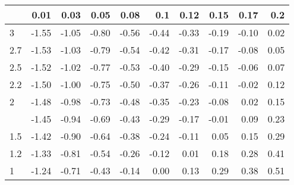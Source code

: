 
\begin{tabular}{lrrrrrrrrr}
\toprule
  & 0.01 & 0.03 & 0.05 & 0.08 & 0.1 & 0.12 & 0.15 & 0.17 & 0.2\\
\midrule
3 & -1.55 & -1.05 & -0.80 & -0.56 & -0.44 & -0.33 & -0.19 & -0.10 & 0.02\\
2.7 & -1.53 & -1.03 & -0.79 & -0.54 & -0.42 & -0.31 & -0.17 & -0.08 & 0.05\\
2.5 & -1.52 & -1.02 & -0.77 & -0.53 & -0.40 & -0.29 & -0.15 & -0.06 & 0.07\\
2.2 & -1.50 & -1.00 & -0.75 & -0.50 & -0.37 & -0.26 & -0.11 & -0.02 & 0.12\\
2 & -1.48 & -0.98 & -0.73 & -0.48 & -0.35 & -0.23 & -0.08 & 0.02 & 0.15\\
\addlinespace
1.7 & -1.45 & -0.94 & -0.69 & -0.43 & -0.29 & -0.17 & -0.01 & 0.09 & 0.23\\
1.5 & -1.42 & -0.90 & -0.64 & -0.38 & -0.24 & -0.11 & 0.05 & 0.15 & 0.29\\
1.2 & -1.33 & -0.81 & -0.54 & -0.26 & -0.12 & 0.01 & 0.18 & 0.28 & 0.41\\
1 & -1.24 & -0.71 & -0.43 & -0.14 & 0.00 & 0.13 & 0.29 & 0.38 & 0.51\\
\bottomrule
\end{tabular}
